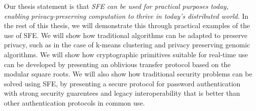 Our thesis statement is that {\it SFE can be used for practical purposes today,
enabling privacy-preserving computation to thrive in today's distributed
world. } In the rest of this thesis, we will demonstrate this through
practical examples of the use of SFE.  We will show how traditional algorithms
can be adapted to preserve privacy, such as in the case of k-means clustering
and privacy preserving genomic algorithms.  We will show how cryptographic
primitives suitable for real-time use can be developed by presenting an
oblivious transfer protocol based on the modular square roots.  We will
also show how traditional security problems can be solved using SFE,
by presenting a secure protocol for password authentication with strong
security guarentees and legacy interoperability that is better than other
authentication protocols in common use.

